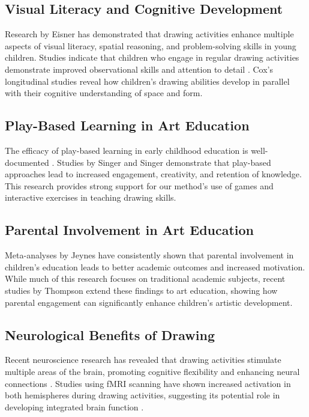 \documentclass{article}
\begin{document}
\subsection{Visual Literacy and Cognitive Development}

Research by Eisner \cite{4eisner2003arts} has demonstrated that drawing activities enhance multiple aspects of visual literacy, spatial reasoning, and problem-solving skills in young children. Studies indicate that children who engage in regular drawing activities demonstrate improved observational skills and attention to detail \cite{5winner2019art}. Cox's longitudinal studies \cite{6cox2005pictorial} reveal how children's drawing abilities develop in parallel with their cognitive understanding of space and form.

\subsection{Play-Based Learning in Art Education}

The efficacy of play-based learning in early childhood education is well-documented \cite{7wainwright2020playful}. Studies by Singer and Singer \cite{8singer2009imagination} demonstrate that play-based approaches lead to increased engagement, creativity, and retention of knowledge. This research provides strong support for our method's use of games and interactive exercises in teaching drawing skills.

\subsection{Parental Involvement in Art Education}

Meta-analyses by Jeynes \cite{9jeynes2016meta} have consistently shown that parental involvement in children's education leads to better academic outcomes and increased motivation. While much of this research focuses on traditional academic subjects, recent studies by Thompson \cite{10thompson2007culture} extend these findings to art education, showing how parental engagement can significantly enhance children's artistic development.

\subsection{Neurological Benefits of Drawing}

Recent neuroscience research has revealed that drawing activities stimulate multiple areas of the brain, promoting cognitive flexibility and enhancing neural connections \cite{11chamberlain2014drawing}. Studies using fMRI scanning have shown increased activation in both hemispheres during drawing activities, suggesting its potential role in developing integrated brain function \cite{12bolwerk2014art}.
\end{document}
